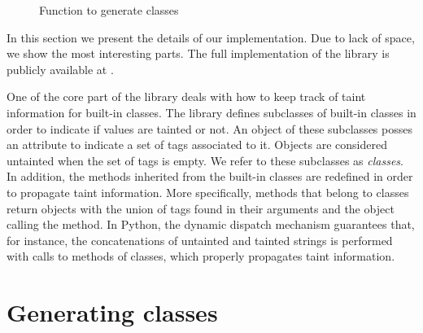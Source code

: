 \begin{figure}[t]
{\small{

\caption{\label{fig:generate} Function to generate \nametklass classes}
}}
\end{figure}

In this section we present the details of our implementation. Due to lack of
space, we show the most interesting parts.
The full
implementation of the library is publicly available at \cite{PythonLib}.


One of the core part of the library 
deals with how to keep track of taint information 
for built-in classes.
The library defines 
subclasses of built-in classes
in order to indicate if values are tainted or not.
An object of these subclasses posses an attribute to indicate a set 
of tags 
associated to it. 
Objects are considered untainted when the
set of tags is empty. 
We refer to these subclasses as
\emph{\nametklass classes}.
In addition, the methods inherited from the built-in classes 
are redefined in order to propagate taint information. 
More specifically, methods that belong to 
\nametklass classes return objects with  
the union of tags found in their arguments and 
the object calling the method. 
In Python, 
the dynamic dispatch 
mechanism guarantees that, for instance, 
the concatenations of untainted and tainted strings is performed 
with calls to methods of \nametklass classes, which properly   
propagates taint information. %

\section{Generating \nametklass classes}
\label{sec:general}

